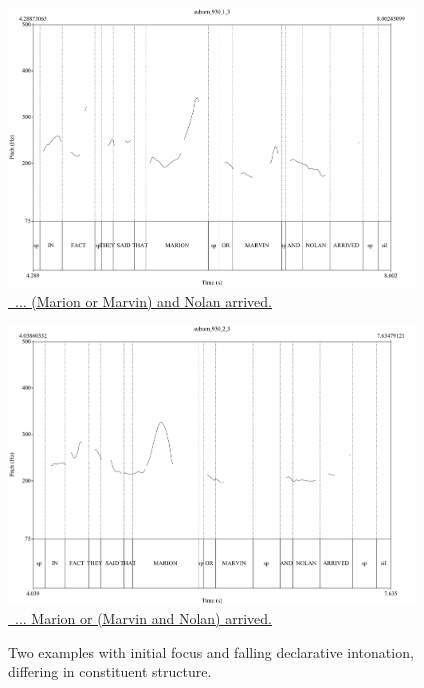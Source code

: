 \documentclass[preprint,review,12pt,authoryear,times]{elsarticle}
\begin{document}
\begin{figure}[ht!]
	\begin{center}
	\parbox{4.25in}{
	        \includegraphics[width=4.25in]{Figures/suborn_930_1_3.pdf}\ \\
	        \href{http://prosodylab.org/~chael/sounds/jphonExamples/suborn_930_1_3.wav}{\footnotesize\ ... (Marion or Marvin) and Nolan arrived.}
	        }
	        
	        \parbox{4.25in}{
	           \includegraphics[width=4.25in]{Figures/suborn_930_2_3.pdf}\ \\
	            \href{http://prosodylab.org/~chael/sounds/jphonExamples/suborn_930_2_3.wav}{\footnotesize \ ... Marion or (Marvin and Nolan) arrived.}
	            }
	            
		\caption{Two examples with initial focus and falling declarative intonation, differing in constituent structure.}
		\label{examm}
	\end{center}
\end{figure}	            
	         
\end{document}
